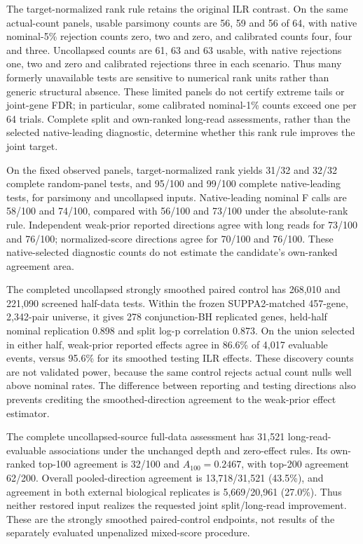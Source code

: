 \documentclass[11pt]{article}
\begin{document}
The target-normalized rank rule retains the original ILR contrast. On the same actual-count panels, usable parsimony counts are 56, 59 and 56 of 64, with native nominal-5\% rejection counts zero, two and zero, and calibrated counts four, four and three. Uncollapsed counts are 61, 63 and 63 usable, with native rejections one, two and zero and calibrated rejections three in each scenario. Thus many formerly unavailable tests are sensitive to numerical rank units rather than generic structural absence. These limited panels do not certify extreme tails or joint-gene FDR; in particular, some calibrated nominal-1\% counts exceed one per 64 trials. Complete split and own-ranked long-read assessments, rather than the selected native-leading diagnostic, determine whether this rank rule improves the joint target.

On the fixed observed panels, target-normalized rank yields 31/32 and 32/32 complete random-panel tests, and 95/100 and 99/100 complete native-leading tests, for parsimony and uncollapsed inputs. Native-leading nominal F calls are 58/100 and 74/100, compared with 56/100 and 73/100 under the absolute-rank rule. Independent weak-prior reported directions agree with long reads for 73/100 and 76/100; normalized-score directions agree for 70/100 and 76/100. These native-selected diagnostic counts do not estimate the candidate's own-ranked agreement area.

The completed uncollapsed strongly smoothed paired control has 268,010 and 221,090 screened half-data tests. Within the frozen SUPPA2-matched 457-gene, 2,342-pair universe, it gives 278 conjunction-BH replicated genes, held-half nominal replication 0.898 and split log-p correlation 0.873. On the union selected in either half, weak-prior reported effects agree in 86.6\% of 4,017 evaluable events, versus 95.6\% for its smoothed testing ILR effects. These discovery counts are not validated power, because the same control rejects actual count nulls well above nominal rates. The difference between reporting and testing directions also prevents crediting the smoothed-direction agreement to the weak-prior effect estimator.

The complete uncollapsed-source full-data assessment has 31,521 long-read-evaluable associations under the unchanged depth and zero-effect rules. Its own-ranked top-100 agreement is 32/100 and \(A_{100}=0.2467\), with top-200 agreement 62/200. Overall pooled-direction agreement is 13,718/31,521 (43.5\%), and agreement in both external biological replicates is 5,669/20,961 (27.0\%). Thus neither restored input realizes the requested joint split/long-read improvement. These are the strongly smoothed paired-control endpoints, not results of the separately evaluated unpenalized mixed-score procedure.
\end{document}
